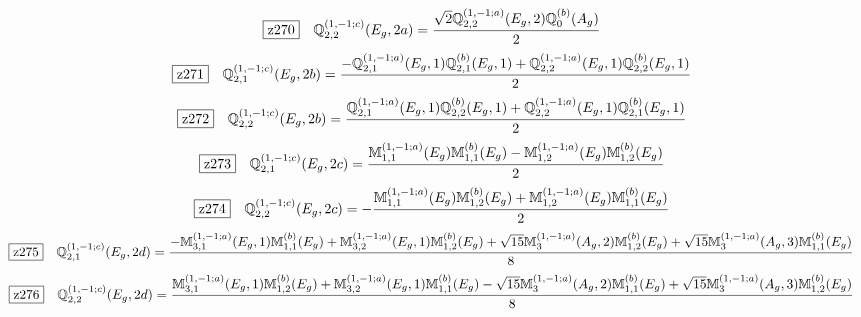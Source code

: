 \documentclass[fleqn,10pt,landscape]{jsarticle}
\begin{document}
\begin{dmath*}
\hspace*{3mm}\fbox{z270}\quad \mathbb{Q}_{2,2}^{(1,-1;c)}(E_{g},2a)=\frac{\sqrt{2} \mathbb{Q}_{2,2}^{(1,-1;a)}(E_{g},2) \mathbb{Q}_{0}^{(b)}(A_{g})}{2}
\end{dmath*}
\begin{dmath*}
\hspace*{3mm}\fbox{z271}\quad \mathbb{Q}_{2,1}^{(1,-1;c)}(E_{g},2b)=\frac{- \mathbb{Q}_{2,1}^{(1,-1;a)}(E_{g},1) \mathbb{Q}_{2,1}^{(b)}(E_{g},1) + \mathbb{Q}_{2,2}^{(1,-1;a)}(E_{g},1) \mathbb{Q}_{2,2}^{(b)}(E_{g},1)}{2}
\end{dmath*}
\begin{dmath*}
\hspace*{3mm}\fbox{z272}\quad \mathbb{Q}_{2,2}^{(1,-1;c)}(E_{g},2b)=\frac{\mathbb{Q}_{2,1}^{(1,-1;a)}(E_{g},1) \mathbb{Q}_{2,2}^{(b)}(E_{g},1) + \mathbb{Q}_{2,2}^{(1,-1;a)}(E_{g},1) \mathbb{Q}_{2,1}^{(b)}(E_{g},1)}{2}
\end{dmath*}
\begin{dmath*}
\hspace*{3mm}\fbox{z273}\quad \mathbb{Q}_{2,1}^{(1,-1;c)}(E_{g},2c)=\frac{\mathbb{M}_{1,1}^{(1,-1;a)}(E_{g}) \mathbb{M}_{1,1}^{(b)}(E_{g}) - \mathbb{M}_{1,2}^{(1,-1;a)}(E_{g}) \mathbb{M}_{1,2}^{(b)}(E_{g})}{2}
\end{dmath*}
\begin{dmath*}
\hspace*{3mm}\fbox{z274}\quad \mathbb{Q}_{2,2}^{(1,-1;c)}(E_{g},2c)=- \frac{\mathbb{M}_{1,1}^{(1,-1;a)}(E_{g}) \mathbb{M}_{1,2}^{(b)}(E_{g}) + \mathbb{M}_{1,2}^{(1,-1;a)}(E_{g}) \mathbb{M}_{1,1}^{(b)}(E_{g})}{2}
\end{dmath*}
\begin{dmath*}
\hspace*{3mm}\fbox{z275}\quad \mathbb{Q}_{2,1}^{(1,-1;c)}(E_{g},2d)=\frac{- \mathbb{M}_{3,1}^{(1,-1;a)}(E_{g},1) \mathbb{M}_{1,1}^{(b)}(E_{g}) + \mathbb{M}_{3,2}^{(1,-1;a)}(E_{g},1) \mathbb{M}_{1,2}^{(b)}(E_{g}) + \sqrt{15} \mathbb{M}_{3}^{(1,-1;a)}(A_{g},2) \mathbb{M}_{1,2}^{(b)}(E_{g}) + \sqrt{15} \mathbb{M}_{3}^{(1,-1;a)}(A_{g},3) \mathbb{M}_{1,1}^{(b)}(E_{g})}{8}
\end{dmath*}
\begin{dmath*}
\hspace*{3mm}\fbox{z276}\quad \mathbb{Q}_{2,2}^{(1,-1;c)}(E_{g},2d)=\frac{\mathbb{M}_{3,1}^{(1,-1;a)}(E_{g},1) \mathbb{M}_{1,2}^{(b)}(E_{g}) + \mathbb{M}_{3,2}^{(1,-1;a)}(E_{g},1) \mathbb{M}_{1,1}^{(b)}(E_{g}) - \sqrt{15} \mathbb{M}_{3}^{(1,-1;a)}(A_{g},2) \mathbb{M}_{1,1}^{(b)}(E_{g}) + \sqrt{15} \mathbb{M}_{3}^{(1,-1;a)}(A_{g},3) \mathbb{M}_{1,2}^{(b)}(E_{g})}{8}
\end{dmath*}
\end{document}
